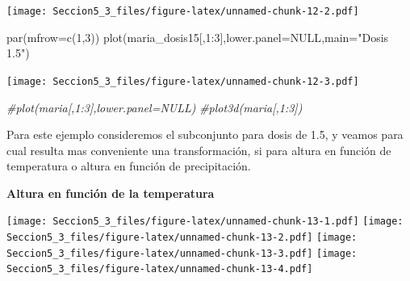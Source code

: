 \documentclass[
]{article}
\newenvironment{Shaded}{\begin{snugshade}}{\end{snugshade}}
\newcommand{\AttributeTok}[1]{\textcolor[rgb]{0.77,0.63,0.00}{#1}}
\newcommand{\CommentTok}[1]{\textcolor[rgb]{0.56,0.35,0.01}{\textit{#1}}}
\newcommand{\ConstantTok}[1]{\textcolor[rgb]{0.00,0.00,0.00}{#1}}
\newcommand{\DecValTok}[1]{\textcolor[rgb]{0.00,0.00,0.81}{#1}}
\newcommand{\FunctionTok}[1]{\textcolor[rgb]{0.00,0.00,0.00}{#1}}
\newcommand{\NormalTok}[1]{#1}
\newcommand{\OtherTok}[1]{\textcolor[rgb]{0.56,0.35,0.01}{#1}}
\newcommand{\SpecialCharTok}[1]{\textcolor[rgb]{0.00,0.00,0.00}{#1}}
\newcommand{\StringTok}[1]{\textcolor[rgb]{0.31,0.60,0.02}{#1}}
\begin{document}
\texttt{[image: Seccion5\_3\_files/figure-latex/unnamed-chunk-12-2.pdf]}

\begin{Shaded}
\begin{Highlighting}[]
\FunctionTok{par}\NormalTok{(}\AttributeTok{mfrow=}\FunctionTok{c}\NormalTok{(}\DecValTok{1}\NormalTok{,}\DecValTok{3}\NormalTok{))}
\FunctionTok{plot}\NormalTok{(maria\_dosis15[,}\DecValTok{1}\SpecialCharTok{:}\DecValTok{3}\NormalTok{],}\AttributeTok{lower.panel=}\ConstantTok{NULL}\NormalTok{,}\AttributeTok{main=}\StringTok{"Dosis 1.5"}\NormalTok{)}
\end{Highlighting}
\end{Shaded}

\texttt{[image: Seccion5\_3\_files/figure-latex/unnamed-chunk-12-3.pdf]}

\begin{Shaded}
\begin{Highlighting}[]
\CommentTok{\#plot(maria[,1:3],lower.panel=NULL)}
\CommentTok{\#plot3d(maria[,1:3])}
\end{Highlighting}
\end{Shaded}

Para este ejemplo consideremos el subconjunto para dosis de 1.5, y
veamos para cual resulta mas conveniente una transformación, si para
altura en función de temperatura o altura en función de precipitación.

\textbf{Altura en función de la temperatura}

\begin{Shaded}
\end{Shaded}

\texttt{[image: Seccion5\_3\_files/figure-latex/unnamed-chunk-13-1.pdf]}
\texttt{[image: Seccion5\_3\_files/figure-latex/unnamed-chunk-13-2.pdf]}
\texttt{[image: Seccion5\_3\_files/figure-latex/unnamed-chunk-13-3.pdf]}
\texttt{[image: Seccion5\_3\_files/figure-latex/unnamed-chunk-13-4.pdf]}

\begin{Shaded}
\end{Shaded}
\end{document}
